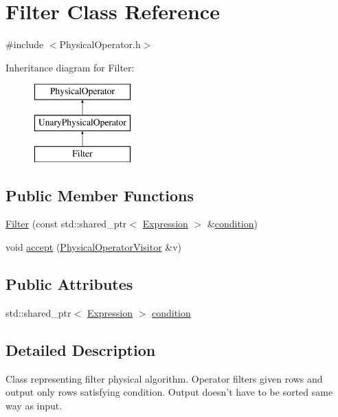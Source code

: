 \hypertarget{class_filter}{\section{Filter Class Reference}
\label{class_filter}
}


{\ttfamily \#include $<$Physical\+Operator.\+h$>$}

Inheritance diagram for Filter\+:\begin{figure}[H]
\begin{center}
\leavevmode
\includegraphics[height=3.000000cm]{class_filter}
\end{center}
\end{figure}
\subsection*{Public Member Functions}
\begin{DoxyCompactItemize}
\item 
\hyperlink{class_filter_a4e75723e5596f5b77b84a395c7453853}{Filter} (const std\+::shared\+\_\+ptr$<$ \hyperlink{class_expression}{Expression} $>$ \&\hyperlink{class_filter_acc551fc888d4b2e9bc36364a3877dbb8}{condition})
\item 
void \hyperlink{class_filter_a1df50e05d64ad3b2cc45d2f9e28127c4}{accept} (\hyperlink{class_physical_operator_visitor}{Physical\+Operator\+Visitor} \&v)
\end{DoxyCompactItemize}
\subsection*{Public Attributes}
\begin{DoxyCompactItemize}
\item 
std\+::shared\+\_\+ptr$<$ \hyperlink{class_expression}{Expression} $>$ \hyperlink{class_filter_acc551fc888d4b2e9bc36364a3877dbb8}{condition}
\end{DoxyCompactItemize}


\subsection{Detailed Description}
Class representing filter physical algorithm. Operator filters given rows and output only rows satisfying condition. Output doesn't have to be sorted same way as input. 

